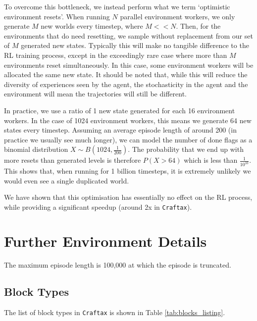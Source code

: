 \documentclass{article}
\theoremstyle{plain}
\theoremstyle{definition}
\theoremstyle{remark}
\begin{document}
To overcome this bottleneck, we instead perform what we term `optimistic environment resets'.  When running $N$ parallel environment workers, we only generate $M$ new worlds every timestep, where $M << N$.  Then, for the environments that do need resetting, we sample without replacement from our set of $M$ generated new states.  Typically this will make no tangible difference to the RL training process, except in the exceedingly rare case where more than $M$ environments reset simultaneously.  In this case, some environment workers will be allocated the same new state.  It should be noted that, while this will reduce the diversity of experiences seen by the agent, the stochasticity in the agent and the environment will mean the trajectories will still be different.

In practice, we use a ratio of 1 new state generated for each 16 environment workers.  In the case of 1024 environment workers, this means we generate 64 new states every timestep.  Assuming an average episode length of around 200 (in practice we usually see much longer), we can model the number of done flags as a binomial distribution $X \sim B(1024, \frac{1}{200})$.  The probability that we end up with more resets than generated levels is therefore $P(X > 64)$ which is less than $\frac{1}{10^{10}}$.  This shows that, when running for 1 billion timesteps, it is extremely unlikely we would even see a single duplicated world.

We have shown that this optimisation has essentially no effect on the RL process, while providing a significant speedup (around 2x in \texttt{Craftax}).


\section{Further Environment Details}\label{app:craftax:details}

The maximum episode length is 100,000 at which the episode is truncated.

\subsection{Block Types}

The list of block types in \texttt{Craftax} is shown in Table \ref{tab:blocks_listing}.
\end{document}
